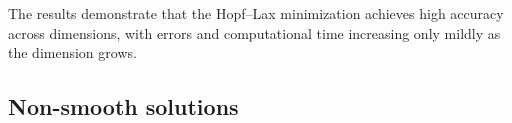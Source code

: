 \documentclass[review,hidelinks,onefignum,onetabnum]{siamart250106}
\begin{document}
The results demonstrate that the Hopf--Lax minimization achieves high accuracy across dimensions, with errors and computational time increasing only mildly as the dimension grows.








\subsection{Non-smooth solutions}
\end{document}
